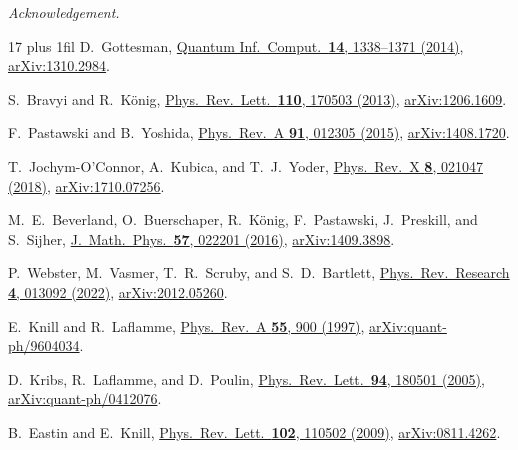 \documentclass[aps,prl,reprint,notitlepage,nofootinbib,nobibnotes]{revtex4-2}
\begin{document}
\begin{acknowledgments}
\textit{Acknowledgement.}
\end{acknowledgments}

\begin{thebibliography}{17}
\rightskip=0pt plus 1fil\relax
{}
D.~Gottesman,
\href{https://doi.org/10.26421/QIC14.15-16-5}
{Quantum Inf.\ Comput.\ \textbf{14}, 1338--1371 (2014)},
\href{https://arxiv.org/abs/1310.2984}{arXiv:1310.2984}.

S.~Bravyi and R.~K\"onig,
\href{https://doi.org/10.1103/PhysRevLett.110.170503}
{Phys.\ Rev.\ Lett.\ \textbf{110}, 170503 (2013)},
\href{https://arxiv.org/abs/1206.1609}{arXiv:1206.1609}.

F.~Pastawski and B.~Yoshida,
\href{https://doi.org/10.1103/PhysRevA.91.012305}
{Phys.\ Rev.\ A \textbf{91}, 012305 (2015)},
\href{https://arxiv.org/abs/1408.1720}{arXiv:1408.1720}.

T.~Jochym-O'Connor, A.~Kubica, and T.~J.~Yoder,
\href{https://doi.org/10.1103/PhysRevX.8.021047}
{Phys.\ Rev.\ X \textbf{8}, 021047 (2018)},
\href{https://arxiv.org/abs/1710.07256}{arXiv:1710.07256}.

M.~E.~Beverland, O.~Buerschaper, R.~K\"onig, F.~Pastawski,
J.~Preskill, and S.~Sijher,
\href{https://doi.org/10.1063/1.4939783}
{J.\ Math.\ Phys.\ \textbf{57}, 022201 (2016)},
\href{https://arxiv.org/abs/1409.3898}{arXiv:1409.3898}.

P.~Webster, M.~Vasmer, T.~R.~Scruby, and S.~D.~Bartlett,
\href{https://doi.org/10.1103/PhysRevResearch.4.013092}
{Phys.\ Rev.\ Research \textbf{4}, 013092 (2022)},
\href{https://arxiv.org/abs/2012.05260}{arXiv:2012.05260}.

E.~Knill and R.~Laflamme,
\href{https://doi.org/10.1103/PhysRevA.55.900}
{Phys.\ Rev.\ A \textbf{55}, 900 (1997)},
\href{https://arxiv.org/abs/quant-ph/9604034}{arXiv:quant-ph/9604034}.

D.~Kribs, R.~Laflamme, and D.~Poulin,
\href{https://doi.org/10.1103/PhysRevLett.94.180501}
{Phys.\ Rev.\ Lett.\ \textbf{94}, 180501 (2005)},
\href{https://arxiv.org/abs/quant-ph/0412076}{arXiv:quant-ph/0412076}.

B.~Eastin and E.~Knill,
\href{https://doi.org/10.1103/PhysRevLett.102.110502}
{Phys.\ Rev.\ Lett.\ \textbf{102}, 110502 (2009)},
\href{https://arxiv.org/abs/0811.4262}{arXiv:0811.4262}.


\end{thebibliography}
\end{document}
